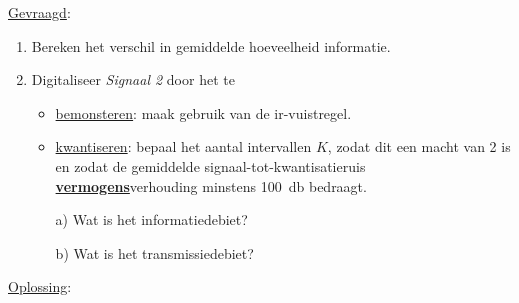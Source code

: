 \documentclass{kuburgiearticle}
\begin{document}
	\underline{Gevraagd}:
	\begin{enumerate}
		\item Bereken het verschil in gemiddelde hoeveelheid informatie.
		\item Digitaliseer \textit{Signaal 2} door het te
		\begin{itemize}
			\item \underline{bemonsteren}: maak gebruik van de ir-vuistregel.
			\item \underline{kwantiseren}: bepaal het aantal intervallen \( K \), zodat dit een macht van 2 is en zodat de gemiddelde signaal-tot-kwantisatieruis \underline{\textbf{vermogens}}verhouding minstens \SI{100}{\decibel} bedraagt.
		\end{itemize}
		\begin{enumerate}
			\item[a)] Wat is het informatiedebiet?
			\item[b)] Wat is het transmissiedebiet?
		\end{enumerate}
	\end{enumerate}

	\underline{Oplossing}:
\end{document}

